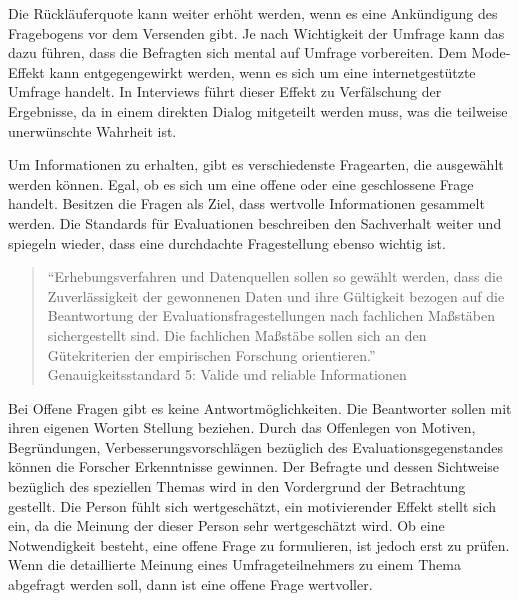 Die Rückläuferquote kann weiter erhöht werden, wenn es eine Ankündigung des Fragebogens vor dem Versenden gibt. 
Je nach Wichtigkeit der Umfrage kann das dazu führen, dass die Befragten sich mental auf Umfrage vorbereiten\autocite[S.38]{Umfragenforschung}.
Dem Mode-Effekt kann entgegengewirkt werden, wenn es sich um eine internetgestützte Umfrage handelt.
In Interviews führt dieser Effekt zu Verfälschung der Ergebnisse, da in einem direkten Dialog mitgeteilt werden muss, was die teilweise unerwünschte Wahrheit ist\autocite[S.163]{Umfragenforschung}.
 
Um Informationen zu erhalten, gibt es verschiedenste Fragearten, die ausgewählt werden können.
Egal, ob es sich um eine offene oder eine geschlossene Frage handelt\autocite[S.31]{2009Fragebogen}. %
Besitzen die Fragen als Ziel, dass wertvolle Informationen gesammelt werden.
Die Standards für Evaluationen beschreiben den Sachverhalt weiter und spiegeln wieder, dass eine durchdachte Fragestellung ebenso wichtig ist.

\begin{quote} \enquote{Erhebungsverfahren und Datenquellen sollen so gewählt werden, dass die Zuverlässigkeit der gewonnenen Daten und ihre Gültigkeit bezogen auf die Beantwortung der Evaluationsfragestellungen nach fachlichen Maßstäben sichergestellt sind. Die fachlichen Maßstäbe sollen sich an den Gütekriterien der empirischen Forschung orientieren.} Genauigkeitsstandard 5: Valide und reliable Informationen\autocite{DegEval} %
\end{quote}

Bei Offene Fragen gibt es keine Antwortmöglichkeiten.
Die Beantworter sollen mit ihren eigenen Worten Stellung beziehen.
Durch das Offenlegen von Motiven, Begründungen, Verbesserungsvorschlägen bezüglich des Evaluationsgegenstandes können die Forscher Erkenntnisse gewinnen.
Der Befragte und dessen Sichtweise bezüglich des speziellen Themas wird in den Vordergrund der Betrachtung gestellt\autocite[S.31]{2009Fragebogen}. %
Die Person fühlt sich wertgeschätzt, ein motivierender Effekt stellt sich ein, da die Meinung der dieser Person sehr wertgeschätzt wird. 
Ob eine Notwendigkeit besteht, eine offene Frage zu formulieren, ist jedoch erst zu prüfen.
Wenn die detaillierte Meinung eines Umfrageteilnehmers zu einem Thema abgefragt werden soll, dann ist eine offene Frage wertvoller. 
 
